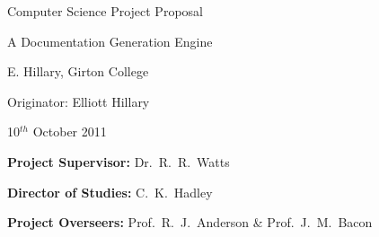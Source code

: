 \documentclass[10pt,twoside,a4paper]{article}
\begin{document}
\vfil

\centerline{\Large Computer Science Project Proposal}
\vspace{0.4in}
\centerline{\Large A Documentation Generation Engine }
\vspace{0.4in}
\centerline{\large E. Hillary, Girton College}
\vspace{0.3in}
\centerline{\large Originator: Elliott Hillary}
\vspace{0.3in}
\centerline{\large 10$^{th}$ October 2011}

\vfil


\noindent
{\bf Project Supervisor:} Dr.~R.~R.~Watts
\vspace{0.2in}

\noindent
{\bf Director of Studies:} C.~K.~Hadley
\vspace{0.2in}
\noindent
 
\noindent
{\bf Project Overseers:} Prof.~R.~J.~Anderson  \& Prof.~J.~M.~Bacon

\vfil

\tableofcontents


\end{document}
